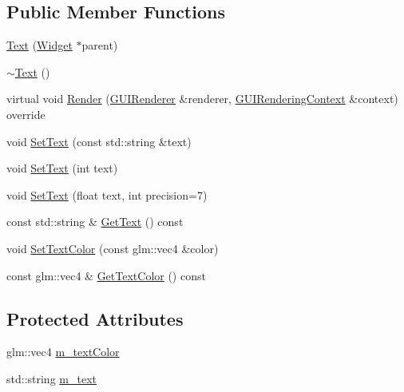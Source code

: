 \subsection*{Public Member Functions}
\begin{DoxyCompactItemize}
\item 
\mbox{\hyperlink{classec__gui_1_1_text_a92d72331de979f4972130bf7d342976f}{Text}} (\mbox{\hyperlink{classec__gui_1_1_widget}{Widget}} $\ast$parent)
\item 
\mbox{\hyperlink{classec__gui_1_1_text_abba2d725d3f9bf3502488d35ec216515}{$\sim$\+Text}} ()
\item 
virtual void \mbox{\hyperlink{classec__gui_1_1_text_a3dab94a21f6fbe9d27f0591b5a5b196b}{Render}} (\mbox{\hyperlink{classec__gui_1_1_g_u_i_renderer}{G\+U\+I\+Renderer}} \&renderer, \mbox{\hyperlink{classec__gui_1_1_g_u_i_rendering_context}{G\+U\+I\+Rendering\+Context}} \&context) override
\item 
void \mbox{\hyperlink{classec__gui_1_1_text_a1aea31d2301d79aeaaffe127cdbf8b73}{Set\+Text}} (const std\+::string \&text)
\item 
void \mbox{\hyperlink{classec__gui_1_1_text_a47ab05bd7932d31df93a22a5e9e90b28}{Set\+Text}} (int text)
\item 
void \mbox{\hyperlink{classec__gui_1_1_text_a2cf00ce993c509d7df86bc257f121da0}{Set\+Text}} (float text, int precision=7)
\item 
const std\+::string \& \mbox{\hyperlink{classec__gui_1_1_text_a9fa6bb29c11502923d993c57bef0aeef}{Get\+Text}} () const
\item 
void \mbox{\hyperlink{classec__gui_1_1_text_ae8f42c56d9a07b455d4a1643a5586671}{Set\+Text\+Color}} (const glm\+::vec4 \&color)
\item 
const glm\+::vec4 \& \mbox{\hyperlink{classec__gui_1_1_text_a6b0c127b16a36144078fbf0c8c069931}{Get\+Text\+Color}} () const
\end{DoxyCompactItemize}
\subsection*{Protected Attributes}
\begin{DoxyCompactItemize}
\item 
glm\+::vec4 \mbox{\hyperlink{classec__gui_1_1_text_af90729dfed09a3c4c94ed03e5769001e}{m\+\_\+text\+Color}}
\item 
std\+::string \mbox{\hyperlink{classec__gui_1_1_text_a97780a155cc50f0d83fe5149e006b938}{m\+\_\+text}}
\end{DoxyCompactItemize}
